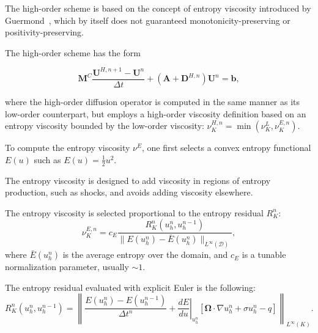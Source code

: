The high-order scheme is based on the concept of entropy
viscosity introduced by Guermond~\cite{guermond_ev,guermond_secondorder}, which by itself
does not guaranteed monotonicity-preserving or positivity-preserving.

The high-order scheme has the form

\begin{equation}\label{eq:highorderscheme}
   \mathbf{M}^C\frac{\mathbf{U}^{H,n+1}-\mathbf{U}^n}{\Delta t}
      +\left(\mathbf{A}+\mathbf{D}^{H,n}\right)\mathbf{U}^n = \mathbf{b},
\end{equation}

where the high-order diffusion operator is computed in the same manner
as its low-order counterpart, but employs a high-order viscosity definition
based on an entropy viscosity bounded by the low-order viscosity:
$\nu^{H,n}_K = \min(\nu^{L}_K,\nu^{E,n}_K)$. 

To compute the entropy viscosity $\nu^{E}$, 
one first selects a convex entropy functional $E(u)$ such as $E(u)=\frac{1}{2}u^2$.

The entropy viscosity is designed to add viscosity in regions of entropy
production, such as shocks, and avoids adding viscosity elsewhere. 

The entropy viscosity is selected proportional to the entropy residual $R_K^n$:
\begin{equation}
   \nu^{E,n}_K = c_E \frac{R_K^n(u_h^n,u_h^{n-1})}      
      {\|E(u_h^n)-\bar{E}(u_h^n)\|_{L^\infty(\mathcal{D})}},
\end{equation}
where 
$\bar{E}(u_h^n)$ is the average
entropy over the domain, 
and $c_E$ is a tunable normalization parameter, 
usually $\sim 1$.

The entropy residual evaluated with explicit Euler is the following:
\begin{equation}
    R_K^n(u_h^n,u_h^{n-1}) = \left\|\frac{E(u_h^n)-E(u_h^{n-1})}{\Delta t^n}
      + \left.\frac{dE}{du}\right|_{u_h^n}\left[\mathbf{\Omega}\cdot\nabla u_h^n
      + \sigma u_h^n
      - q \right]\right\|_{L^\infty(K)}.
\end{equation}
